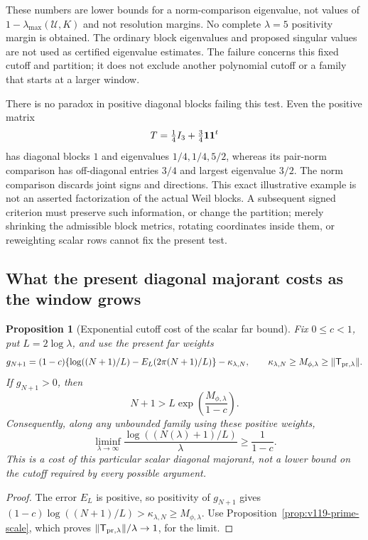 \documentclass[11pt]{article}
\newtheorem{proposition}[theorem]{Proposition}
\theoremstyle{remark}
\begin{document}
These numbers are lower bounds for a norm-comparison eigenvalue,
not values of $1-\lambda_{\max}(\mathcal U,K)$ and not resolution
margins. No complete $\lambda=5$ positivity margin is obtained.
The ordinary block eigenvalues and proposed singular values are not
used as certified eigenvalue estimates. The failure concerns this
fixed cutoff and partition; it does not exclude another polynomial
cutoff or a family that starts at a larger window.

There is no paradox in positive diagonal blocks failing this test.
Even the positive matrix
\[
 T=\tfrac14 I_3+\tfrac34{\bf1}{\bf1}^t
\]
has diagonal blocks $1$ and eigenvalues $1/4,1/4,5/2$, whereas its
pair-norm comparison has off-diagonal entries $3/4$ and largest
eigenvalue $3/2$. The norm comparison discards joint signs and
directions. This exact illustrative example is not an asserted
factorization of the actual Weil blocks. A subsequent signed
criterion must preserve such information, or change the partition;
merely shrinking the admissible block metrics, rotating coordinates
inside them, or reweighting scalar rows cannot fix the present test.

\subsection*{What the present diagonal majorant costs as the window grows}

\begin{proposition}[Exponential cutoff cost of the scalar far bound]
\label{prop:v125-cutoff-cost}
Fix $0\le c<1$, put $L=2\log\lambda$, and use the present far
weights
\[
 g_{N+1}=(1-c)\{\log((N+1)/L)-E_L(2\pi(N+1)/L)\}
               -\kappa_{\lambda,N},
 \qquad \kappa_{\lambda,N}\ge M_{\phi,\lambda}
                    \ge\|\mathsf T_{{\rm pr},\lambda}\|.
\]
If $g_{N+1}>0$, then
\begin{equation}\label{eq:v125-cutoff-cost}
 N+1>L\exp\!\left(\frac{M_{\phi,\lambda}}{1-c}\right).
\end{equation}
Consequently, along any unbounded family using these positive weights,
\[
 \liminf_{\lambda\to\infty}
 \frac{\log((N(\lambda)+1)/L)}{\lambda}\ge\frac1{1-c}.
\]
This is a cost of this particular scalar diagonal majorant, not a
lower bound on the cutoff required by every possible argument.
\end{proposition}
\begin{proof}
The error $E_L$ is positive, so positivity of $g_{N+1}$ gives
$(1-c)\log((N+1)/L)>\kappa_{\lambda,N}\ge M_{\phi,\lambda}$.
Use Proposition~\ref{prop:v119-prime-scale}, which proves
$\|\mathsf T_{{\rm pr},\lambda}\|/\lambda\to1$, for the limit.
\end{proof}
\end{document}
